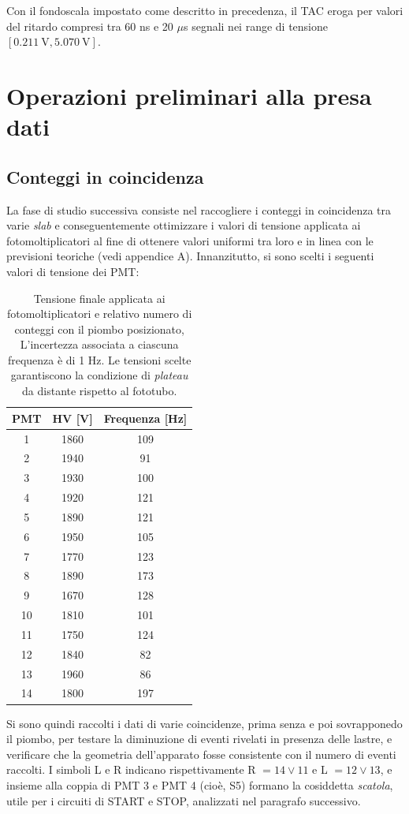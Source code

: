 \documentclass[10pt, oneside, a4paper]{article}   	%
\begin{document}
Con il fondoscala impostato come descritto in precedenza, il TAC eroga per valori del ritardo compresi tra 60 ns e 20 $\mu$s segnali nei range di tensione $[0.211 \ \mbox{V}, 5.070 \ \mbox{V}]$.
%
%
\section{Operazioni preliminari alla presa dati}
\subsection{Conteggi in coincidenza}
La fase di studio successiva consiste nel raccogliere i conteggi in coincidenza tra varie \emph{slab} e conseguentemente ottimizzare i valori di tensione applicata ai fotomoltiplicatori al fine di ottenere valori uniformi tra loro e in linea con le previsioni teoriche (vedi appendice A). 
Innanzitutto, si sono scelti i seguenti valori di tensione dei PMT: 
\begin{table}[h]
		\centering
	\begin{tabular}{ccc}
		\toprule
		PMT	&	HV [V]	&	Frequenza [Hz]\\	
		\midrule
		1	&	1860	&	109	\\
		2	&	1940	&	91	\\
		3	&	1930	&	100	\\
		4	&	1920	&	121	\\
		5	&	1890	&	121	\\
		6	&	1950	&	105	\\
		7	&	1770	&	123	\\
		8	&	1890	&	173	\\
		9	&	1670	&	128	\\
		10	&	1810	&	101	\\
		11	&	1750	&	124	\\
		12	&	1840	&	82	\\
		13	&	1960	&	86	\\
		14	&	1800	&	197	\\
		\bottomrule
	\end{tabular}
	\caption{Tensione finale applicata ai fotomoltiplicatori e relativo numero di conteggi con il piombo posizionato, L'incertezza associata a ciascuna frequenza è di 1 Hz. Le tensioni scelte garantiscono la condizione di \emph{plateau} da distante rispetto al fototubo.}
	\label{HV_counts}
\end{table}
Si sono quindi raccolti i dati di varie coincidenze, prima senza e poi sovrapponedo il piombo, per testare la diminuzione di eventi rivelati in presenza delle lastre, e verificare che la geometria dell'apparato fosse consistente con il numero di eventi raccolti. I simboli L e R indicano rispettivamente R $= 14 \vee 11 $ e L $= 12 \vee 13$, e insieme alla coppia di PMT 3 e PMT 4 (cioè, S5) formano la cosiddetta \emph{scatola}, utile per i circuiti di START e STOP, analizzati nel paragrafo successivo.
\end{document}

